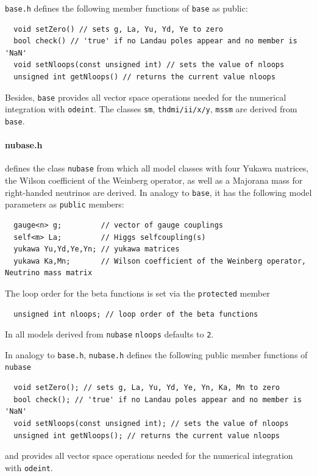 \documentclass[11pt,a4paper]{article}
\begin{document}
\texttt{base.h} defines the following member functions of \texttt{base} as public:
\begin{lstlisting}
  void setZero() // sets g, La, Yu, Yd, Ye to zero
  bool check() // 'true' if no Landau poles appear and no member is 'NaN'
  void setNloops(const unsigned int) // sets the value of nloops
  unsigned int getNloops() // returns the current value nloops
\end{lstlisting}
Besides, \texttt{base} provides all vector space operations needed for the numerical integration with \texttt{odeint}. The classes \texttt{sm}, \texttt{thdmi/ii/x/y}, \texttt{mssm} are derived from \texttt{base}.

\paragraph{nubase.h}
defines the class \texttt{nubase} from which all model classes with four Yukawa matrices, the Wilson coefficient of the Weinberg operator, as well as a Majorana mass for right-handed neutrinos are derived.
In analogy to \texttt{base}, it has the following model parameters as \texttt{public} members:
\begin{lstlisting}
  gauge<n> g;         // vector of gauge couplings
  self<m> La;         // Higgs selfcoupling(s)
  yukawa Yu,Yd,Ye,Yn; // yukawa matrices
  yukawa Ka,Mn;       // Wilson coefficient of the Weinberg operator, Neutrino mass matrix   
\end{lstlisting}
The loop order for the beta functions is set via the \texttt{protected} member
\begin{lstlisting}
  unsigned int nloops; // loop order of the beta functions
\end{lstlisting}
In all models derived from \texttt{nubase} \texttt{nloops} defaults to \texttt{2}.

In analogy to \texttt{base.h}, \texttt{nubase.h} defines the following public member functions of \texttt{nubase}
\begin{lstlisting}
  void setZero(); // sets g, La, Yu, Yd, Ye, Yn, Ka, Mn to zero
  bool check(); // 'true' if no Landau poles appear and no member is 'NaN'
  void setNloops(const unsigned int); // sets the value of nloops
  unsigned int getNloops(); // returns the current value nloops
\end{lstlisting}
and provides all vector space operations needed for the numerical integration with \texttt{odeint}.
\end{document}
